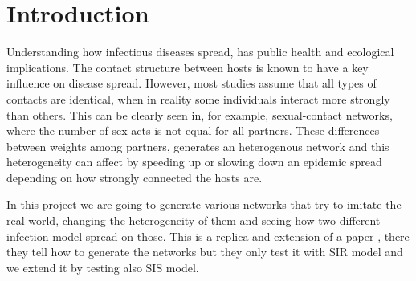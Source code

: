 \section{Introduction}
Understanding how infectious diseases spread, has public health and ecological implications. The contact structure between hosts is known to have a key influence on disease spread. However, most studies assume that all types of contacts are identical, when in reality some individuals interact more strongly than others. This can be clearly seen in, for example, sexual-contact networks, where the number of sex acts is not equal for all partners. These differences between weights among partners, generates an heterogenous network and this heterogeneity can affect by speeding up or slowing down an epidemic spread depending on how strongly connected the hosts are.

In this project we are going to generate various networks that try to imitate the real world, changing the heterogeneity of them and seeing how two different infection model spread on those. This is a replica and extension of a paper \cite{10.1371/journal.pcbi.1003352}, there they tell how to generate the networks but they only test it with SIR model and we extend it by testing also SIS model.